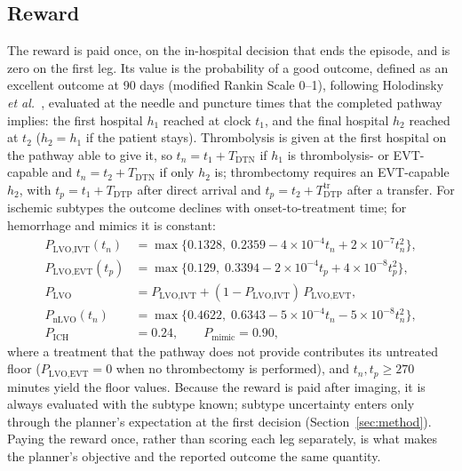 \subsection{Reward}
The reward is paid once, on the in-hospital decision that ends the episode, and is zero on the first leg. Its value is the probability of a good outcome, defined as an excellent outcome at 90 days (modified Rankin Scale 0--1), following Holodinsky \emph{et al.}~\cite{holodinsky2018}, evaluated at the needle and puncture times that the completed pathway implies: the first hospital $h_1$ reached at clock $t_1$, and the final hospital $h_2$ reached at $t_2$ ($h_2 = h_1$ if the patient stays). Thrombolysis is given at the first hospital on the pathway able to give it, so $t_n = t_1 + T_{\text{DTN}}$ if $h_1$ is thrombolysis- or EVT-capable and $t_n = t_2 + T_{\text{DTN}}$ if only $h_2$ is; thrombectomy requires an EVT-capable $h_2$, with $t_p = t_1 + T_{\text{DTP}}$ after direct arrival and $t_p = t_2 + T_{\text{DTP}}^{\text{tr}}$ after a transfer. For ischemic subtypes the outcome declines with onset-to-treatment time; for hemorrhage and mimics it is constant:
{\small\begin{align}
P_{\text{LVO,IVT}}(t_n) &= \max\{0.1328,\; 0.2359 - 4\!\times\!10^{-4} t_n + 2\!\times\!10^{-7} t_n^2\},\\
P_{\text{LVO,EVT}}(t_p) &= \max\{0.129,\; 0.3394 - 2\!\times\!10^{-4} t_p + 4\!\times\!10^{-8} t_p^2\},\\
P_{\text{LVO}} &= P_{\text{LVO,IVT}} + (1 - P_{\text{LVO,IVT}})\,P_{\text{LVO,EVT}},\\
P_{\text{nLVO}}(t_n) &= \max\{0.4622,\; 0.6343 - 5\!\times\!10^{-4} t_n - 5\!\times\!10^{-8} t_n^2\},\\
P_{\text{ICH}} &= 0.24, \qquad P_{\text{mimic}} = 0.90,
\end{align}}
where a treatment that the pathway does not provide contributes its untreated floor ($P_{\text{LVO,EVT}} = 0$ when no thrombectomy is performed), and $t_n, t_p \geq 270$ minutes yield the floor values. Because the reward is paid after imaging, it is always evaluated with the subtype known; subtype uncertainty enters only through the planner's expectation at the first decision (Section~\ref{sec:method}). Paying the reward once, rather than scoring each leg separately, is what makes the planner's objective and the reported outcome the same quantity.
